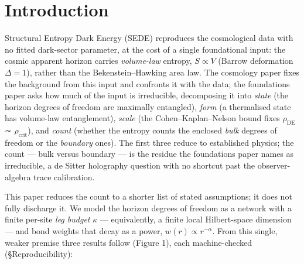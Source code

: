 \documentclass[12pt]{iopart}
\begin{document}
\section{Introduction}\label{sec-1}

Structural Entropy Dark Energy (SEDE) reproduces the cosmological data
with no fitted dark-sector parameter, at the cost of a single
foundational input: the cosmic apparent horizon carries
\emph{volume-law} entropy, \(S \propto  V\) (Barrow deformation
\(\Delta  = 1\)), rather than the Bekenstein--Hawking area law. The
cosmology paper \citep{Pandev:2026cosmology} fixes the background from
this input and confronts it with the data; the foundations paper
\citep{Pandev:2026foundations} asks how much of the input is
irreducible, decomposing it into \emph{state} (the horizon degrees of
freedom are maximally entangled), \emph{form} (a thermalised state has
volume-law entanglement), \emph{scale} (the Cohen--Kaplan--Nelson bound
fixes \(\rho _\mathrm{DE}\) ∼ \(\rho _{\mathrm{crit}}\)), and
\emph{count} (whether the entropy counts the enclosed \emph{bulk}
degrees of freedom or the \emph{boundary} ones). The first three reduce
to established physics; the count --- bulk versus boundary --- is the
residue the foundations paper names as irreducible, a de Sitter
holography question with no shortcut past the observer-algebra trace
calibration.

This paper reduces the count to a shorter list of stated assumptions; it
does not fully discharge it. We model the horizon degrees of freedom as
a network with a finite per-site \emph{leg budget} \(\kappa\) ---
equivalently, a finite local Hilbert-space dimension --- and bond
weights that decay as a power, \(w(r) \propto  r^{-\alpha }\). From this
single, weaker premise three results follow (Figure 1), each
machine-checked (§Reproducibility):
\end{document}
